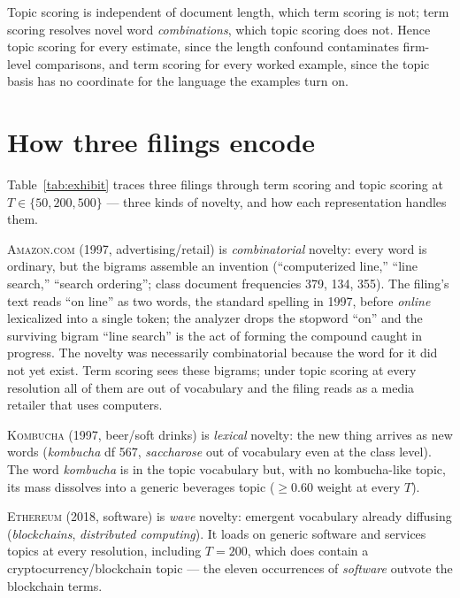 Topic scoring is independent of document length, which term scoring is not; term scoring
resolves novel word \emph{combinations}, which topic scoring does not. Hence
topic scoring for every estimate, since the length confound contaminates
firm-level comparisons, and term scoring for every worked example, since the
topic basis has no coordinate for the language the examples turn on.

\section{How three filings encode}\label{app:exhibit}

Table~\ref{tab:exhibit} traces three filings through term scoring and topic
scoring at $T \in \{50, 200, 500\}$ --- three kinds of novelty, and how each
representation handles them.

\textsc{Amazon.com} (1997, advertising/retail) is \emph{combinatorial}
novelty: every word is ordinary, but the bigrams assemble an invention
(``computerized line,'' ``line search,'' ``search ordering''; class
document frequencies 379, 134, 355). The filing's text reads ``on line''
as two words, the standard spelling in 1997, before \emph{online}
lexicalized into a single token; the analyzer drops the stopword ``on''
and the surviving bigram ``line search'' is the act of forming the
compound caught in progress. The novelty was necessarily combinatorial
because the word for it did not yet exist. Term scoring sees these
bigrams; under topic scoring at every resolution all of them are out of
vocabulary and the filing reads as a media retailer that uses computers.

\textsc{Kombucha} (1997, beer/soft drinks) is \emph{lexical} novelty: the
new thing arrives as new words (\emph{kombucha} df 567, \emph{saccharose}
out of vocabulary even at the class level). The word \emph{kombucha} is in
the topic vocabulary but, with no kombucha-like topic, its mass dissolves
into a generic beverages topic ($\geq 0.60$ weight at every $T$).

\textsc{Ethereum} (2018, software) is \emph{wave} novelty: emergent
vocabulary already diffusing (\emph{blockchains}, \emph{distributed
computing}). It loads on generic software and services topics at every
resolution, including $T = 200$, which does contain a
cryptocurrency/blockchain topic --- the eleven occurrences of
\emph{software} outvote the blockchain terms.


